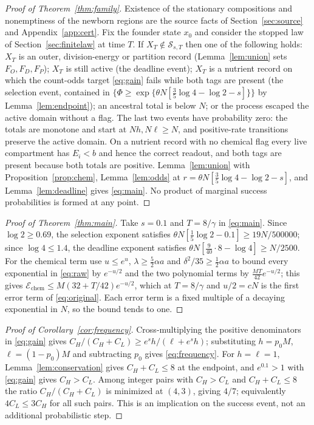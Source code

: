 \documentclass[11pt,a4paper]{article}
\theoremstyle{plain}
\theoremstyle{definition}
\theoremstyle{remark}
\newcommand{\cS}{\mathcal S}
\newcommand{\chem}{\mathcal E_{\mathrm{chem}}}
\begin{document}
\begin{proof}[Proof of Theorem~\ref{thm:family}]
Existence of the stationary compositions and nonemptiness of the newborn regions are the source facts of Section~\ref{sec:source} and Appendix~\ref{app:cert}. Fix the founder state $x_0$ and consider the stopped law of Section~\ref{sec:finitelaw} at time $T$. If $X_T\notin\cS_{s,T}$ then one of the following holds: $X_T$ is an outer, division-energy or partition record (Lemma~\ref{lem:union} sets $F_O,F_D,F_P$); $X_T$ is still active (the deadline event); $X_T$ is a nutrient record on which the count-odds target \eqref{eq:gain} fails while both tags are present (the selection event, contained in $\{\Phi\geq\exp\{\theta N[\frac35\log4-\log2-s]\}\}$ by Lemma~\ref{lem:endpoint}); an ancestral total is below $N$; or the process escaped the active domain without a flag. The last two events have probability zero: the totals are monotone and start at $Nh,N\ell\geq N$, and positive-rate transitions preserve the active domain. On a nutrient record with no chemical flag every live compartment has $E_i<b$ and hence the correct readout, and both tags are present because both totals are positive. Lemma~\ref{lem:union} with Proposition~\ref{prop:chem}, Lemma~\ref{lem:odds} at $r=\theta N[\frac35\log4-\log2-s]$, and Lemma~\ref{lem:deadline} gives \eqref{eq:main}. No product of marginal success probabilities is formed at any point.
\end{proof}

\begin{proof}[Proof of Theorem~\ref{thm:main}]
Take $s=0.1$ and $T=8/\gamma$ in \eqref{eq:main}. Since $\log2\geq0.69$, the selection exponent satisfies $\theta N[\frac15\log2-0.1]\geq19N/500000$; since $\log4\leq1.4$, the deadline exponent satisfies $\theta N[\frac{9}{40}\cdot8-\log4]\geq N/2500$. For the chemical term use $u\leq e^{u}$, $\lambda\geq\frac52\alpha a$ and $\delta^2/35\geq\frac12\alpha a$ to bound every exponential in \eqref{eq:raw} by $e^{-u/2}$ and the two polynomial terms by $\frac{MT}{42}e^{-u/2}$; this gives $\chem\leq M(32+T/42)e^{-u/2}$, which at $T=8/\gamma$ and $u/2=cN$ is the first error term of \eqref{eq:original}. Each error term is a fixed multiple of a decaying exponential in $N$, so the bound tends to one.
\end{proof}

\begin{proof}[Proof of Corollary~\ref{cor:frequency}]
Cross-multiplying the positive denominators in \eqref{eq:gain} gives $C_H/(C_H+C_L)\geq e^{s}h/(\ell+e^{s}h)$; substituting $h=p_0M$, $\ell=(1-p_0)M$ and subtracting $p_0$ gives \eqref{eq:frequency}. For $h=\ell=1$, Lemma~\ref{lem:conservation} gives $C_H+C_L\leq8$ at the endpoint, and $e^{0.1}>1$ with \eqref{eq:gain} gives $C_H>C_L$. Among integer pairs with $C_H>C_L$ and $C_H+C_L\leq8$ the ratio $C_H/(C_H+C_L)$ is minimized at $(4,3)$, giving $4/7$; equivalently $4C_L\leq3C_H$ for all such pairs. This is an implication on the success event, not an additional probabilistic step.
\end{proof}
\end{document}
